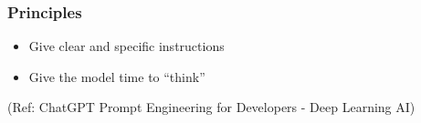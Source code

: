 \begin{frame}[fragile]\frametitle{Principles}

\begin{itemize}
\item Give clear and specific instructions
\item Give the model time to “think”
\end{itemize}
		
{\tiny (Ref: ChatGPT Prompt Engineering for Developers - Deep Learning AI)}
		
\end{frame}

